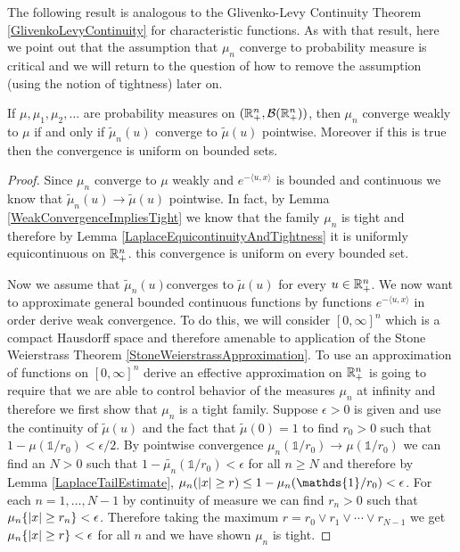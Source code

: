 The following result is analogous to the Glivenko-Levy Continuity
Theorem \ref{GlivenkoLevyContinuity} for characteristic functions.  As
with that result, here we point out that the assumption that $\mu_n$
converge to probability measure is critical and we will return to the
question of how to remove the assumption (using the notion of tightness) later on.
\begin{thm}\label{GlivenkoLevyContinuityLaplace}If $\mu, \mu_1, \mu_2, \dots$
  are probability measures on $(\mathbb{R}^n_+, \mathcal{B}(\mathbb{R}^n_+))$,
  then $\mu_n$ converge weakly to $\mu$ if and only if $\tilde{\mu}_n(u)$
  converge to $\tilde{\mu}(u)$ pointwise.  Moreover if this is true
  then the convergence is uniform on bounded sets.
\end{thm}
\begin{proof}
Since $\mu_n$ converge to $\mu$ weakly and $e^{-\langle u,x \rangle}$
is bounded and continuous we know that $\tilde{\mu}_n(u) \to
\tilde{\mu}(u)$ pointwise.  In fact, by Lemma
\ref{WeakConvergenceImpliesTight} we know that the family $\mu_n$
is tight and therefore by Lemma
\ref{LaplaceEquicontinuityAndTightness} it is uniformly equicontinuous
on $\mathbb{R}^n_+$.  this convergence is uniform on
every bounded set.

Now we assume that $\tilde{\mu}_n(u)$converges to $\tilde{\mu}(u)$ for
every $u \in \mathbb{R}^n_+$.  We now want to approximate general bounded
continuous functions by functions $e^{-\langle u,x \rangle}$ in order
derive weak convergence.  To do this, we will consider $[0,\infty]^n$
which is a compact Hausdorff space and therefore amenable to
application of the Stone Weierstrass Theorem
\ref{StoneWeierstrassApproximation}.  To use an approximation of
functions on $[0,\infty]^n$ derive an effective approximation on
$\mathbb{R}^n_+$ is going to require that we are able to control behavior
of the measures $\mu_n$ at infinity and therefore we first show that
$\mu_n$ is a tight family.  Suppose $\epsilon > 0$ is given and use
the continuity of $\tilde{\mu}(u)$ and the fact that
$\tilde{\mu}(0)=1$ to find $r_0 > 0$ such that $1 - \mu(\mathds{1}/r_0) <
\epsilon/2$.  By pointwise convergence $\mu_n(\mathds{1}/r_0) \to \mu(\mathds{1}/r_0)$ we
can find an $N > 0$ such that $1 - \tilde{\mu_n}(\mathds{1}/r_0) < \epsilon$ for all $n
\geq N$ and therefore by Lemma \ref{LaplaceTailEstimate}, $\mu_n(\abs{x} \geq r)  \leq 1 - \mu_n(\mathds{1}/r_0) <
\epsilon$.  For each $n = 1, \dotsc, N-1$ by continuity of measure  we
can find $r_n > 0$ such that $\mu_n\lbrace \left \vert x \right \vert \geq r_n \rbrace <
\epsilon$.  Therefore taking the maximum $r = r_0 \vee r_1 \vee \dotsb \vee
r_{N-1}$ we get $\mu_n\lbrace \left \vert x \right \vert \geq r \rbrace <
\epsilon$ for all $n$ and we have shown $\mu_n$ is tight.


\end{proof}
